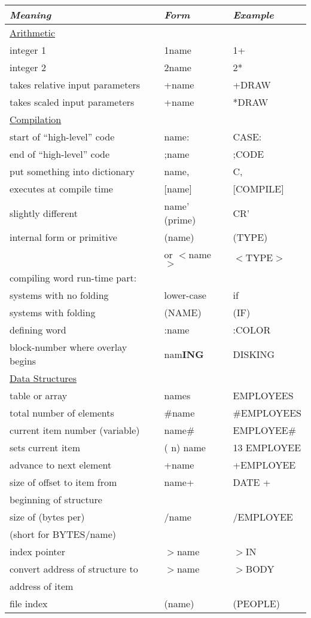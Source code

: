 \begin{longtable}{lll}
{}{\setlength{\parsep}{0cm}}
{\em Meaning}&{\em Form}&{\em Example}\\[2ex] \endhead
\underline{Arithmetic}\\
integer 1&1name&1+\\
integer 2&2name&2*\\
takes relative input parameters&+name&+DRAW\\
takes scaled input parameters&+name&*DRAW\\[1ex]
\underline{Compilation}\\
start of ``high-level'' code&name:&CASE:\\
end of ``high-level'' code&;name&;CODE\\
put something into dictionary&name,&C,\\
executes at compile time&[name]&[COMPILE]\\
slightly different&name' (prime)&CR'\\
internal form or primitive&(name)&(TYPE)\\
&or \(<\)name\(>\)&\(<\)TYPE\(>\)\\
compiling word run-time part:\\
 systems with no folding&lower-case&if\\
 systems with folding&(NAME)&(IF)\\
defining word&:name&:COLOR\\
block-number where overlay begins&nam{\bf ING}&DISKING\\[1ex]
\underline{Data Structures}\\
table or array&names&EMPLOYEES\\
total number of elements&\#name&\#EMPLOYEES\\
current item number (variable)&name\#&EMPLOYEE\#\\
sets current item&( n) name&13 EMPLOYEE\\
advance to next element&+name&+EMPLOYEE\\
size of offset to item from&name+&DATE +\\
beginning of structure\\
size of (bytes per)&/name&/EMPLOYEE\\
(short for BYTES/name)\\
index pointer&\(>\)name&\(>\)IN\\
convert address of structure to&\(>\)name&\(>\)BODY\\
address of item\\
file index&(name)&(PEOPLE)\\

\end{longtable}
